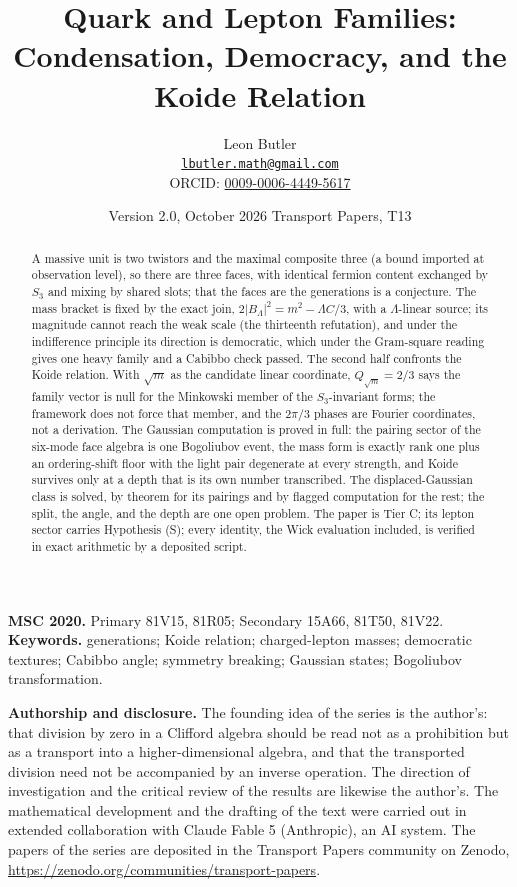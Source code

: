 \documentclass[11pt]{article}
\title{\bfseries Quark and Lepton Families: Condensation, Democracy, and the Koide Relation}
\author{Leon Butler\\ \normalsize\href{mailto:lbutler.math@gmail.com}{\texttt{lbutler.math@gmail.com}}\\ \normalsize ORCID: \href{https://orcid.org/0009-0006-4449-5617}{0009-0006-4449-5617}}
\date{Version 2.0, October 2026 \textperiodcentered{} Transport Papers, T13}
\theoremstyle{definition}
\begin{document}
\maketitle

\begin{abstract}
\normalsize
A massive unit is two twistors and the maximal composite three (a bound imported at observation level), so there are three faces, with identical fermion content exchanged by $S_{3}$ and mixing by shared slots; that the faces are the generations is a conjecture. The mass bracket is fixed by the exact join, $2|B_{\Lambda}|^{2} = m^{2} - \Lambda C/3$, with a $\Lambda$-linear source; its magnitude cannot reach the weak scale (the thirteenth refutation), and under the indifference principle its direction is democratic, which under the Gram-square reading gives one heavy family and a Cabibbo check passed. The second half confronts the Koide relation. With $\sqrt{m}$ as the candidate linear coordinate, $Q_{\sqrt{m}} = 2/3$ says the family vector is null for the Minkowski member of the $S_{3}$-invariant forms; the framework does not force that member, and the $2\pi/3$ phases are Fourier coordinates, not a derivation. The Gaussian computation is proved in full: the pairing sector of the six-mode face algebra is one Bogoliubov event, the mass form is exactly rank one plus an ordering-shift floor with the light pair degenerate at every strength, and Koide survives only at a depth that is its own number transcribed. The displaced-Gaussian class is solved, by theorem for its pairings and by flagged computation for the rest; the split, the angle, and the depth are one open problem. The paper is Tier C; its lepton sector carries Hypothesis (S); every identity, the Wick evaluation included, is verified in exact arithmetic by a deposited script.
\end{abstract}

\medskip
\noindent\textbf{MSC 2020.} Primary 81V15, 81R05; Secondary 15A66, 81T50, 81V22.\\
\textbf{Keywords.} generations; Koide relation; charged-lepton masses; democratic textures; Cabibbo angle; symmetry breaking; Gaussian states; Bogoliubov transformation.

\newpage
\textbf{Authorship and disclosure. }The founding idea of the series is the author's: that division by zero in a Clifford algebra should be read not as a prohibition but as a transport into a higher-dimensional algebra, and that the transported division need not be accompanied by an inverse operation. The direction of investigation and the critical review of the results are likewise the author's. The mathematical development and the drafting of the text were carried out in extended collaboration with Claude Fable 5 (Anthropic), an AI system. The papers of the series are deposited in the Transport Papers community on Zenodo, \url{https://zenodo.org/communities/transport-papers}.
\end{document}
